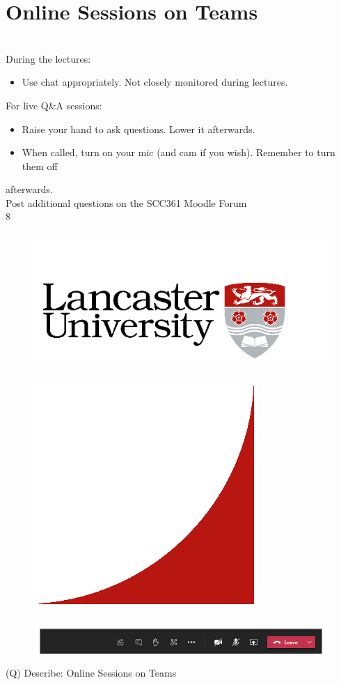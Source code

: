 \documentclass[12pt]{article}
\begin{document}
\section{Online Sessions on Teams}
\\
During the lectures:\\
\begin{itemize}
  \item Use  chat  appropriately. Not closely monitored during lectures.
\end{itemize}
For live Q\&A sessions:\\
\begin{itemize}
  \item Raise your hand to ask questions. Lower it afterwards.
  \item When called, turn on your mic (and cam if you wish). Remember to turn them off 
\end{itemize}
afterwards.\\
Post additional questions on the SCC361 Moodle Forum\\
8\\
\begin{figure}[H]
\includegraphics[width=0.5\linewidth]{page8-image-1.png}
\end{figure}
\begin{figure}[H]
\includegraphics[width=0.5\linewidth]{page8-image-2.png}
\end{figure}
\begin{figure}[H]
\includegraphics[width=0.5\linewidth]{page8-image-3.png}
\end{figure}
\clearpage
(Q)
Describe: Online Sessions on Teams
\clearpage
\end{document}
